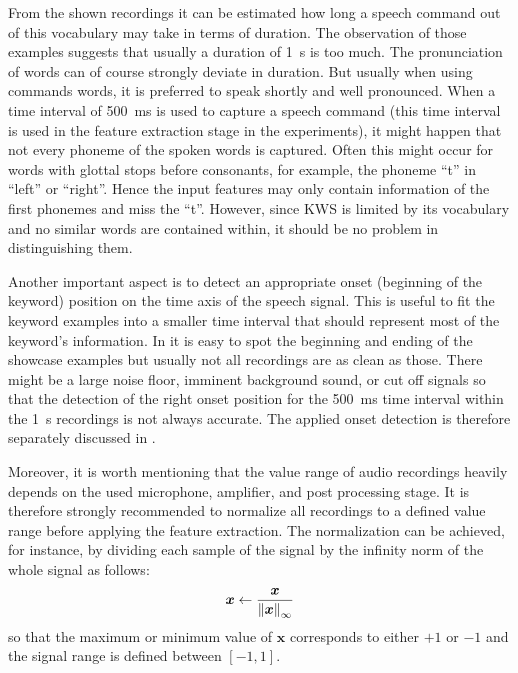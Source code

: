 \FloatBarrier
\noindent
From the shown recordings it can be estimated how long a speech command out of this vocabulary may take in terms of duration.
The observation of those examples suggests that usually a duration of \SI{1}{\second} is too much.
The pronunciation of words can of course strongly deviate in duration.
But usually when using commands words, it is preferred to speak shortly and well pronounced.
When a time interval of \SI{500}{\milli\second} is used to capture a speech command (this time interval is used in the feature extraction stage in the experiments), it might happen that not every phoneme of the spoken words is captured.
Often this might occur for words with glottal stops before consonants, for example, the phoneme \enquote{t} in \enquote{left} or \enquote{right}.
Hence the input features may only contain information of the first phonemes and miss the \enquote{t}.
However, since KWS is limited by its vocabulary and no similar words are contained within, it should be no problem in distinguishing them.

Another important aspect is to detect an appropriate onset (beginning of the keyword) position on the time axis of the speech signal.
This is useful to fit the keyword examples into a smaller time interval that should represent most of the keyword's information.
In  it is easy to spot the beginning and ending of the showcase examples but usually not all recordings are as clean as those.
There might be a large noise floor, imminent background sound, or cut off signals so that the detection of the right onset position for the \SI{500}{\milli\second} time interval within the \SI{1}{\second} recordings is not always accurate.
The applied onset detection is therefore separately discussed in .

Moreover, it is worth mentioning that the value range of audio recordings heavily depends on the used microphone, amplifier, and post processing stage.
It is therefore strongly recommended to normalize all recordings to a defined value range before applying the feature extraction.
The normalization can be achieved, for instance, by dividing each sample of the signal by the infinity norm of the whole signal as follows:
\begin{equation}
  \bm{x} \gets \frac{\bm{x}}{\norm{\bm{x}}_\infty}
\end{equation}
so that the maximum or minimum value of $\bm{x}$ corresponds to either $+1$ or $-1$ and the signal range is defined between $[-1, 1]$.